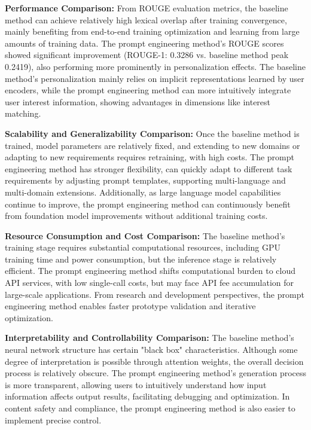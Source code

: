 \documentclass[10pt,a4paper]{article}
\begin{document}
\textbf{Performance Comparison:} From ROUGE evaluation metrics, the baseline method can achieve relatively high lexical overlap after training convergence, mainly benefiting from end-to-end training optimization and learning from large amounts of training data. The prompt engineering method's ROUGE scores showed significant improvement (ROUGE-1: 0.3286 vs. baseline method peak 0.2419), also performing more prominently in personalization effects. The baseline method's personalization mainly relies on implicit representations learned by user encoders, while the prompt engineering method can more intuitively integrate user interest information, showing advantages in dimensions like interest matching.

\textbf{Scalability and Generalizability Comparison:} Once the baseline method is trained, model parameters are relatively fixed, and extending to new domains or adapting to new requirements requires retraining, with high costs. The prompt engineering method has stronger flexibility, can quickly adapt to different task requirements by adjusting prompt templates, supporting multi-language and multi-domain extensions. Additionally, as large language model capabilities continue to improve, the prompt engineering method can continuously benefit from foundation model improvements without additional training costs.

\textbf{Resource Consumption and Cost Comparison:} The baseline method's training stage requires substantial computational resources, including GPU training time and power consumption, but the inference stage is relatively efficient. The prompt engineering method shifts computational burden to cloud API services, with low single-call costs, but may face API fee accumulation for large-scale applications. From research and development perspectives, the prompt engineering method enables faster prototype validation and iterative optimization.

\textbf{Interpretability and Controllability Comparison:} The baseline method's neural network structure has certain "black box" characteristics. Although some degree of interpretation is possible through attention weights, the overall decision process is relatively obscure. The prompt engineering method's generation process is more transparent, allowing users to intuitively understand how input information affects output results, facilitating debugging and optimization. In content safety and compliance, the prompt engineering method is also easier to implement precise control.
\end{document}
